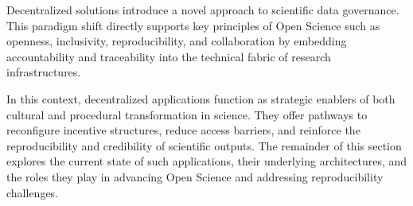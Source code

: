 \documentclass{article}
\begin{document}
Decentralized solutions introduce a novel approach to scientific data governance. This paradigm shift directly supports key principles of Open Science such as openness, inclusivity, reproducibility, and collaboration by embedding accountability and traceability into the technical fabric of research infrastructures.

In this context, decentralized applications function as strategic enablers of both cultural and procedural transformation in science. They offer pathways to reconfigure incentive structures, reduce access barriers, and reinforce the reproducibility and credibility of scientific outputs. The remainder of this section explores the current state of such applications, their underlying architectures, and the roles they play in advancing Open Science and addressing reproducibility challenges.


\end{document}
